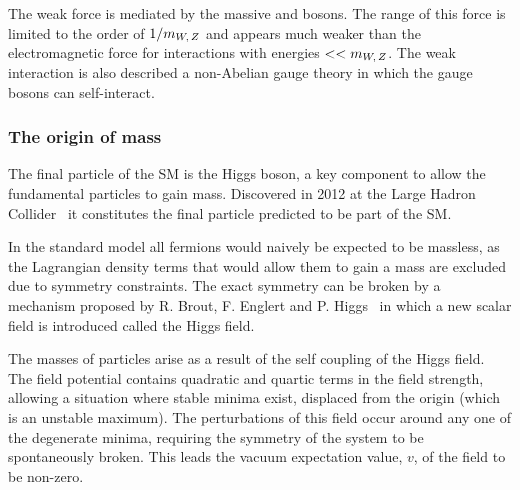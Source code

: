The weak force is mediated by the massive \Wpm and \Z bosons. The range of this force is limited to the order of $1/m_{{W},\,{Z}}$ and appears much weaker than the electromagnetic force for interactions with energies $<< m_{{W},\,{Z}}$. The weak interaction is also described a non-Abelian gauge theory in which the gauge bosons can self-interact. 



\subsubsection{The origin of mass}
The final particle of the SM is the Higgs boson, a key component to allow the fundamental particles to gain mass. Discovered in 2012 at the Large Hadron Collider~\cite{Aad:2012tfa,Chatrchyan:2012xdj} it constitutes the final particle predicted to be part of the SM. 

In the standard model all fermions would naively be expected to be massless, as the Lagrangian density terms that would allow them to gain a mass are excluded due to symmetry constraints. The exact symmetry can be broken by a mechanism proposed by R. Brout, F. Englert and P. Higgs~\cite{PhysRevLett.13.508,PhysRevLett.13.321} in which a new scalar field is introduced called the Higgs field. 

The masses of particles arise as a result of the self coupling of the Higgs field. The field potential contains quadratic and quartic terms in the field strength, allowing a situation where stable minima exist, displaced from the origin (which is an unstable maximum). The perturbations of this field occur around any one of the degenerate minima, requiring the symmetry of the system to be spontaneously broken. This leads the vacuum expectation value, $v$, of the field to be non-zero.   



